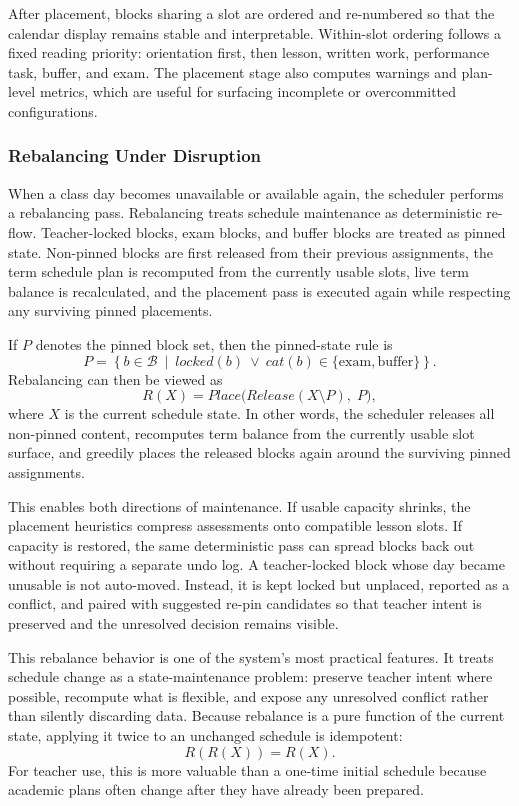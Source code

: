 \documentclass[conference]{IEEEtran}
\begin{document}
After placement, blocks sharing a slot are ordered and re-numbered so that the
calendar display remains stable and interpretable. Within-slot ordering follows a
fixed reading priority: orientation first, then lesson, written work,
performance task, buffer, and exam. The placement stage also computes warnings
and plan-level metrics, which are useful for surfacing incomplete or
overcommitted configurations.

\subsubsection{Rebalancing Under Disruption}

When a class day becomes unavailable or available again, the scheduler performs a
rebalancing pass. Rebalancing treats schedule maintenance as deterministic
re-flow. Teacher-locked blocks, exam blocks, and buffer blocks are treated as
pinned state. Non-pinned blocks are first released from their previous
assignments, the term schedule plan is recomputed from the currently usable
slots, live term balance is recalculated, and the placement pass is executed
again while respecting any surviving pinned placements.

If \(P\) denotes the pinned block set, then the pinned-state rule is
\begin{equation}
P=\left\{b \in \mathcal{B}\ \middle|\ locked(b)\ \lor\ cat(b)\in\{\text{exam},\text{buffer}\}\right\}.
\end{equation}
Rebalancing can then be viewed as
\begin{equation}
R(X)=Place\bigl(Release(X \setminus P),\;P\bigr),
\end{equation}
where \(X\) is the current schedule state. In other words, the scheduler releases
all non-pinned content, recomputes term balance from the currently usable slot
surface, and greedily places the released blocks again around the surviving
pinned assignments.

This enables both directions of maintenance. If usable capacity shrinks, the
placement heuristics compress assessments onto compatible lesson slots. If
capacity is restored, the same deterministic pass can spread blocks back out
without requiring a separate undo log. A teacher-locked block whose day became
unusable is not auto-moved. Instead, it is kept locked but unplaced, reported as
a conflict, and paired with suggested re-pin candidates so that teacher intent is
preserved and the unresolved decision remains visible.

This rebalance behavior is one of the system's most practical features. It treats
schedule change as a state-maintenance problem: preserve teacher intent where
possible, recompute what is flexible, and expose any unresolved conflict rather
than silently discarding data. Because rebalance is a pure function of the
current state, applying it twice to an unchanged schedule is idempotent:
\begin{equation}
R(R(X)) = R(X).
\end{equation}
For teacher use, this is more valuable than a one-time initial schedule because
academic plans often change after they have already been prepared.
\end{document}
